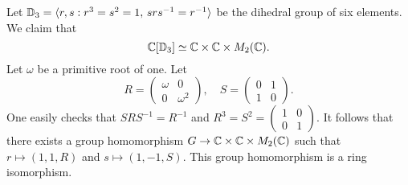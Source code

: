 \begin{example}
	Let $\mathbb{D}_3=\langle r,s:r^3=s^2=1,\,srs^{-1}=r^{-1}\rangle$ be the dihedral
	group of six elements. We claim that 
	\[
	\mathbb{C}[\mathbb{D}_3]\simeq\mathbb{C}\times\mathbb{C}\times M_2(\mathbb{C}).
	\]
	Let $\omega$ be a primitive root of one. Let 
	\[
	R=\begin{pmatrix}
		\omega&0\\
		0&\omega^2	
	\end{pmatrix},
	\quad
	S=\begin{pmatrix}
		0&1\\
		1&0
	\end{pmatrix}.
 	\]
 	One easily checks that $SRS^{-1}=R^{-1}$ and $R^3=S^2=\begin{pmatrix}
		1&0\\
		0&1	
	\end{pmatrix}$. It follows that there exists a group homomorphism
	$G\to\mathbb{C}\times\mathbb{C}\times M_2(\mathbb{C})$ such that
	$r\mapsto (1,1,R)$ and $s\mapsto (1,-1,S)$. This group homomorphism
	is a ring isomorphism.  
\end{example}




 